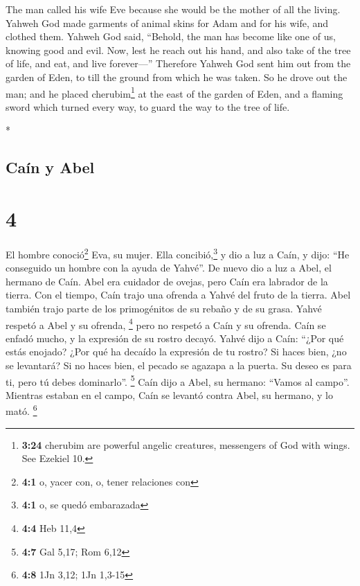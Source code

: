 \begin{paracol}{2}
\begin{otherlanguage}{english}
 The man called his wife Eve because she would be the
mother of all the living.  Yahweh God made garments of
animal skins for Adam and for his wife, and clothed them.
 Yahweh God said, ``Behold, the man has become like one
of us, knowing good and evil. Now, lest he reach out his hand, and also
take of the tree of life, and eat, and live forever---'' 
Therefore Yahweh God sent him out from the garden of Eden, to till the
ground from which he was taken.  So he drove out the man;
and he placed cherubim\footnote{\textbf{3:24} cherubim are powerful
  angelic creatures, messengers of God with wings. See Ezekiel 10.} at
the east of the garden of Eden, and a flaming sword which turned every
way, to guard the way to the tree of life.

\end{otherlanguage}

\switchcolumn[0]*

\hypertarget{cauxedn-y-abel}{%
\subsection{Caín y Abel}\label{cauxedn-y-abel}}

\hypertarget{section-6}{%
\section{4}\label{section-6}}

 El hombre conoció\footnote{\textbf{4:1} o, yacer con, o,
  tener relaciones con} Eva, su mujer. Ella concibió,\footnote{\textbf{4:1}
  o, se quedó embarazada} y dio a luz a Caín, y dijo: ``He conseguido un
hombre con la ayuda de Yahvé''.  De nuevo dio a luz a
Abel, el hermano de Caín. Abel era cuidador de ovejas, pero Caín era
labrador de la tierra.  Con el tiempo, Caín trajo una
ofrenda a Yahvé del fruto de la tierra.  Abel también
trajo parte de los primogénitos de su rebaño y de su grasa. Yahvé
respetó a Abel y su ofrenda, \footnote{\textbf{4:4} Heb 11,4}
 pero no respetó a Caín y su ofrenda. Caín se enfadó
mucho, y la expresión de su rostro decayó.  Yahvé dijo a
Caín: ``¿Por qué estás enojado? ¿Por qué ha decaído la expresión de tu
rostro?  Si haces bien, ¿no se levantará? Si no haces
bien, el pecado se agazapa a la puerta. Su deseo es para ti, pero tú
debes dominarlo''. \footnote{\textbf{4:7} Gal 5,17; Rom 6,12}
 Caín dijo a Abel, su hermano: ``Vamos al campo''.
Mientras estaban en el campo, Caín se levantó contra Abel, su hermano, y
lo mató. \footnote{\textbf{4:8} 1Jn 3,12; 1Jn 1,3-15}


\end{paracol}
